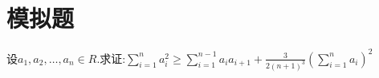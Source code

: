 \documentclass[]{article}
\title{}
\author{}
\date{}
\begin{document}
\maketitle
\section{模拟题}{
设$a_1,a_2,…,a_n \in R.$求证:$\sum\limits_{i=1}^n{a_i^2}\geq \sum\limits_{i=1}^{n-1}a_{i}a_{i+1}+\frac{3}{2(n+1)^3}(\sum\limits_{i=1}^n{a_i})^2$\\
\iffalse
配方，得到$a_1^2+\sum\limits_{i=1}^{n-1}(a_i-a_{i+1})^+a_n^2 \geq \frac{3}{2(n+1)^3}(\sum\limits_{i=1}^n{a_i})^2 $\\
 \qquad 由Cauchy不等式得\\$(n^2+(n-1)^2+(n-2)^2…1^2+0^2)(a_1^2+(a_1-a_2)^2+(a_2-a_3)^2+…+a_n^2) \\ \geq (na_1^2-(n-1)a_1^2+(n-1)a_2^2-(n-2)a_2^2+(n-2)a_3^2-(n-3)a_3^2+…+a_n^2)^2$\\
然后yy即可.
\fi
}
\end{document}
